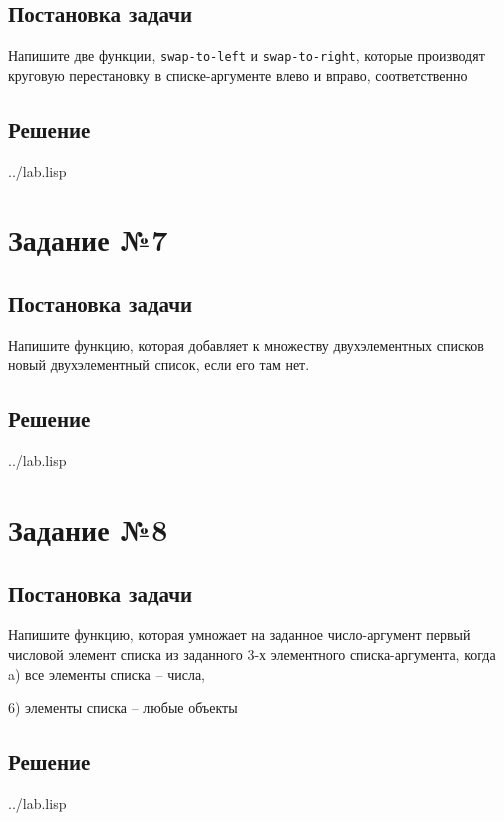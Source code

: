 \subsection*{Постановка задачи}
Напишите две функции, \texttt{swap-to-left} и \texttt{swap-to-right}, которые производят круговую перестановку в списке-аргументе влево и вправо, соответственно

\subsection*{Решение}
\begin{lstinputlisting}[label=third,caption=Решение задания №6, language=lisp, firstline=62, lastline=69]{../lab.lisp}
\end{lstinputlisting}

\section*{Задание №7}
\subsection*{Постановка задачи}
Напишите функцию, которая добавляет к множеству двухэлементных списков новый двухэлементный список, если его там нет.

\subsection*{Решение}
\begin{lstinputlisting}[label=third,caption=Решение задания №7, language=lisp, firstline=75, lastline=86]{../lab.lisp}
\end{lstinputlisting}

\section*{Задание №8}
\subsection*{Постановка задачи}
Напишите функцию, которая умножает на заданное число-аргумент первый числовой
элемент списка из заданного 3-х элементного списка-аргумента, когда\\

a) все элементы списка -- числа,

6) элементы списка -- любые объекты

\subsection*{Решение}
\begin{lstinputlisting}[label=third,caption=Решение задания №8, language=lisp, firstline=92, lastline=98]{../lab.lisp}
\end{lstinputlisting}

